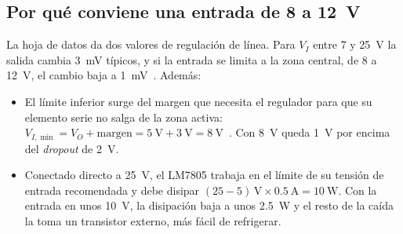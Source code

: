\subsection{Por qué conviene una entrada de \SI{8}{} a \SI{12}{\volt}}
La hoja de datos da dos valores de regulación de línea. Para $V_I$ entre \SI{7}{} y \SI{25}{\volt} la salida cambia \SI{3}{\milli\volt} típicos, y si la entrada se limita a la zona central, de \SI{8}{} a \SI{12}{\volt}, el cambio baja a \SI{1}{\milli\volt}~\cite[Sec.~6-9-3]{ap3}. Además:
\begin{itemize}
    \item El límite inferior surge del margen que necesita el regulador para que su elemento serie no salga de la zona activa: $V_{I,\min} = V_O + \text{margen} = \SI{5}{\volt} + \SI{3}{\volt} = \SI{8}{\volt}$~\cite[Ec.~15-8 y Sec.~15-9.2]{coughlin}. Con \SI{8}{\volt} queda \SI{1}{\volt} por encima del \emph{dropout} de \SI{2}{\volt}.
    \item Conectado directo a \SI{25}{\volt}, el LM7805 trabaja en el límite de su tensión de entrada recomendada y debe disipar $(25 - 5)\,\si{\volt} \times \SI{0,5}{\ampere} = \SI{10}{\watt}$. Con la entrada en unos \SI{10}{\volt}, la disipación baja a unos \SI{2,5}{\watt} y el resto de la caída la toma un transistor externo, más fácil de refrigerar.
\end{itemize}
